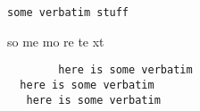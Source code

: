 \verb!some verbatim stuff!

so
me
mo
re
te
xt
\begin{verbatim}
        here is some verbatim
  here is some verbatim
   here is some verbatim
\end{verbatim}
